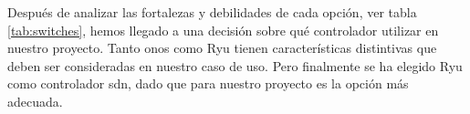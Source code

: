 

Después de analizar las fortalezas y debilidades de cada opción, ver tabla \ref{tab:switches}, hemos llegado a una decisión sobre qué controlador utilizar en nuestro proyecto. Tanto \gls{onos} como Ryu tienen características distintivas que deben ser consideradas en nuestro caso de uso. Pero finalmente se ha elegido Ryu como controlador \gls{sdn}, dado que para nuestro proyecto es la opción más adecuada.